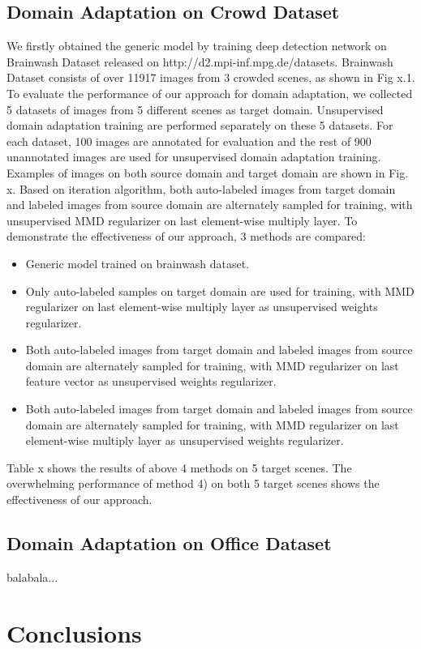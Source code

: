 \documentclass[runningheads]{llncs}
\begin{document}
\subsection{Domain Adaptation on Crowd Dataset}
We firstly obtained the generic model by training deep detection network on Brainwash Dataset released on http://d2.mpi-inf.mpg.de/datasets. Brainwash Dataset consists of over 11917 images from 3 crowded scenes, as shown in Fig x.1. To evaluate the performance of our approach for domain adaptation, we collected 5 datasets of images from 5 different scenes as target domain. Unsupervised domain adaptation training are performed separately on these 5 datasets. For each dataset, 100 images are annotated for evaluation and the rest of 900 unannotated images are used for unsupervised domain adaptation training. Examples of images on both source domain and target domain are shown in Fig. x.
Based on iteration algorithm, both auto-labeled images from target domain and labeled images from source domain are alternately sampled for training, with unsupervised MMD regularizer on last element-wise multiply layer. To demonstrate the effectiveness of our approach, 3 methods are compared:
\begin{itemize}
\item Generic model trained on brainwash dataset.
\item Only auto-labeled samples on target domain are used for training, with MMD regularizer on last element-wise multiply layer as unsupervised weights regularizer.
\item Both auto-labeled images from target domain and labeled images from source domain are alternately sampled for training, with MMD regularizer on last feature vector as unsupervised weights regularizer.
\item Both auto-labeled images from target domain and labeled images from source domain are alternately sampled for training, with MMD regularizer on last element-wise multiply layer as unsupervised weights regularizer.
\end{itemize}
Table x shows the results of above 4 methods on 5 target scenes. The overwhelming performance of method 4) on both 5 target scenes shows the effectiveness of our approach.

\subsection{Domain Adaptation on Office Dataset}
balabala...

\section{Conclusions}
\end{document}
